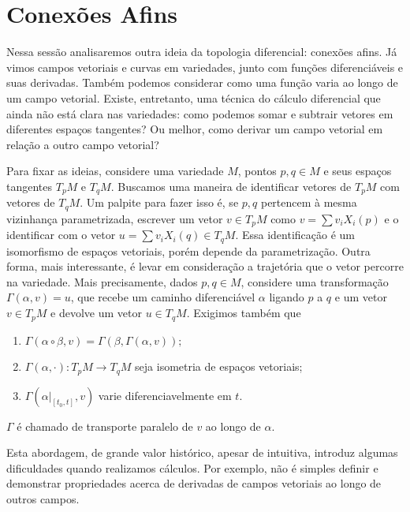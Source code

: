 \section{Conexões Afins}
\label{sec:conexoes-afins}
Nessa sessão analisaremos outra ideia da topologia diferencial: conexões afins.
Já vimos campos vetoriais e curvas em variedades, junto com funções diferenciáveis e suas derivadas. Também podemos considerar como uma função varia ao longo de um campo vetorial. Existe, entretanto, uma técnica do cálculo diferencial que ainda não está clara nas variedades: como podemos somar e subtrair vetores em diferentes espaços tangentes? Ou melhor, como derivar um campo vetorial em relação a outro campo vetorial?

Para fixar as ideias, considere uma variedade $M$, pontos $p,q \in M$ e seus espaços tangentes $T_{p}M$ e $T_{q}M$. Buscamos uma maneira de identificar vetores de $T_{p}M$ com vetores de $T_{q}M$.
Um palpite para fazer isso é, se $p, q$ pertencem à mesma vizinhança parametrizada, escrever um vetor $v \in T_{p}M$ como $v=\sum v_{i}X_{i}(p)$ e o identificar com o vetor $u=\sum v_{i}X_{i}(q) \in T_{q}M$. Essa identificação é um isomorfismo de espaços vetoriais, porém depende da parametrização. Outra forma, mais interessante, é levar em consideração a trajetória que o vetor percorre na variedade. Mais precisamente, dados $p,q \in M$, considere uma transformação $\Gamma(\alpha, v) = u$, que recebe um caminho diferenciável $\alpha$ ligando $p$ a $q$ e um vetor $v \in T_{p}M$ e devolve um vetor $u \in T_{q}M$. Exigimos também que
\begin{enumerate}[label=(\roman*)]
	\item $\Gamma(\alpha \circ \beta, v) = \Gamma(\beta, \Gamma(\alpha, v));$
	\item $\Gamma(\alpha, \cdot):T_{p}M\to T_{q}M$ seja isometria de espaços vetoriais;
	\item $\Gamma(\alpha|_{[t_{0},t]},v)$ varie diferenciavelmente em $t$.
\end{enumerate}

$\Gamma$ é chamado de transporte paralelo de $v$ ao longo de $\alpha$.

Esta abordagem, de grande valor histórico, apesar de intuitiva, introduz algumas dificuldades quando realizamos cálculos. Por exemplo, não é simples definir e demonstrar propriedades acerca de derivadas de campos vetoriais ao longo de outros campos.

